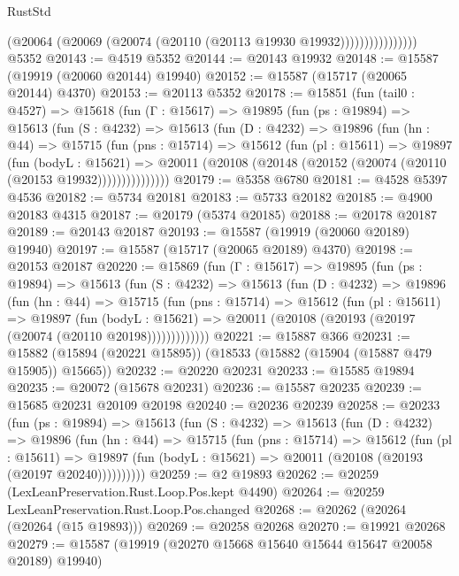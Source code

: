 \begin{lexlean}{RustStd}
\begin{coremodule}
                          (@20064 (@20069 (@20074 (@20110 (@20113 @19930 @19932))))))))))))))))
    @5352
@20143 := @4519 @5352
@20144 := @20143 @19932
@20148 := @15587 (@19919 (@20060 @20144) @19940)
@20152 := @15587 (@15717 (@20065 @20144) @4370)
@20153 := @20113 @5352
@20178 := @15851
    (fun (tail0 : @4527) =>
    @15618
      (fun (Γ : @15617) =>
      @19895
        (fun (ps : @19894) =>
        @15613
          (fun (S : @4232) =>
          @15613
            (fun (D : @4232) =>
            @19896
              (fun (hn : @44) =>
              @15715
                (fun (pns : @15714) =>
                @15612
                  (fun (pl : @15611) =>
                  @19897
                    (fun (bodyL : @15621) =>
                    @20011 (@20108 (@20148 (@20152 (@20074 (@20110 (@20153 @19932)))))))))))))))
@20179 := @5358 @6780
@20181 := @4528 @5397 @4536
@20182 := @5734 @20181
@20183 := @5733 @20182
@20185 := @4900 @20183 @4315
@20187 := @20179 (@5374 @20185)
@20188 := @20178 @20187
@20189 := @20143 @20187
@20193 := @15587 (@19919 (@20060 @20189) @19940)
@20197 := @15587 (@15717 (@20065 @20189) @4370)
@20198 := @20153 @20187
@20220 := @15869
    (fun (Γ : @15617) =>
    @19895
      (fun (ps : @19894) =>
      @15613
        (fun (S : @4232) =>
        @15613
          (fun (D : @4232) =>
          @19896
            (fun (hn : @44) =>
            @15715
              (fun (pns : @15714) =>
              @15612
                (fun (pl : @15611) =>
                @19897
                  (fun (bodyL : @15621) =>
                  @20011 (@20108 (@20193 (@20197 (@20074 (@20110 @20198)))))))))))))
@20221 := @15887 @366
@20231 := @15882 (@15894 (@20221 @15895)) (@18533 (@15882 (@15904 (@15887 @479 @15905)) @15665))
@20232 := @20220 @20231
@20233 := @15585 @19894
@20235 := @20072 (@15678 @20231)
@20236 := @15587 @20235
@20239 := @15685 @20231 @20109 @20198
@20240 := @20236 @20239
@20258 := @20233
    (fun (ps : @19894) =>
    @15613
      (fun (S : @4232) =>
      @15613
        (fun (D : @4232) =>
        @19896
          (fun (hn : @44) =>
          @15715
            (fun (pns : @15714) =>
            @15612
              (fun (pl : @15611) =>
              @19897 (fun (bodyL : @15621) => @20011 (@20108 (@20193 (@20197 @20240))))))))))
@20259 := @2 @19893
@20262 := @20259 (LexLeanPreservation.Rust.Loop.Pos.kept @4490)
@20264 := @20259 LexLeanPreservation.Rust.Loop.Pos.changed
@20268 := @20262 (@20264 (@20264 (@15 @19893)))
@20269 := @20258 @20268
@20270 := @19921 @20268
@20279 := @15587 (@19919 (@20270 @15668 @15640 @15644 @15647 @20058 @20189) @19940)

\end{coremodule}
\end{lexlean}
